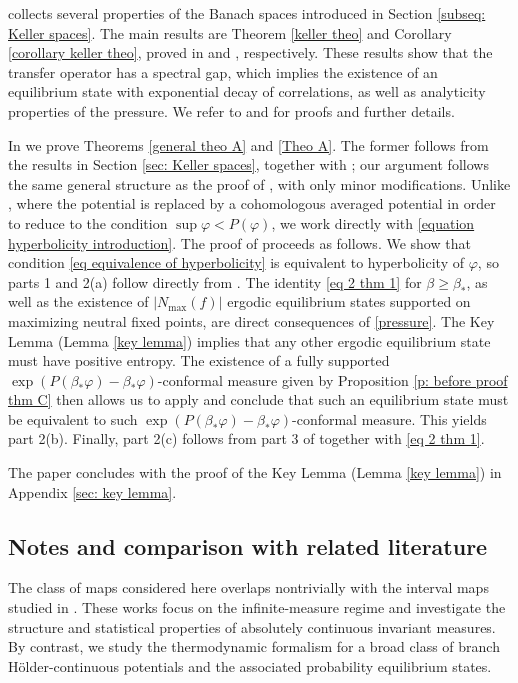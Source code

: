 \documentclass[12pt]{amsart}
\numberwithin{equation}{section} %
\numberwithin{figure}{section} %
\theoremstyle{plain}
\theoremstyle{definition}
\theoremstyle{remark}
\theoremstyle{citing}
\renewcommand{\=}{\coloneqq}
\newcommand{\Nmax}{N_\text{max}(f)}
\begin{document}
 collects several properties of the Banach spaces introduced in Section \ref{subseq: Keller spaces}. The main results are Theorem \ref{keller theo} and Corollary \ref{corollary keller theo}, proved in \cite{Keller1} and \cite{Juan1}, respectively. These results show that the transfer operator has a spectral gap, which implies the existence of an equilibrium state with exponential decay of correlations, as well as analyticity properties of the pressure. We refer to \cite{Keller1} and \cite{Juan1} for proofs and further details.

In  we prove Theorems \ref{general theo A} and \ref{Theo A}. The former follows from the results in Section \ref{sec: Keller spaces}, together with \cite[Theorem 6]{Dobbs}; our argument follows the same general structure as the proof of \cite[Theorem B]{Juan1}, with only minor modifications. Unlike \cite{Juan1}, where the potential is replaced by a cohomologous averaged potential in order to reduce to the condition $\sup\varphi<P(\varphi)$, we work directly with \eqref{equation hyperbolicity introduction}. The proof of  proceeds as follows. We show that condition \eqref{eq equivalence of hyperbolicity} is equivalent to hyperbolicity of $\varphi$, so parts 1 and 2(a) follow directly from . The identity \eqref{eq 2 thm 1} for $\beta\geq \beta_*$, as well as the existence of $|\Nmax|$ ergodic equilibrium states supported on maximizing neutral fixed points, are direct consequences of \eqref{pressure}. The Key Lemma (Lemma \ref{key lemma}) implies that any other ergodic equilibrium state must have positive entropy. The existence of a fully supported $\exp(P(\beta_*\varphi)-\beta_*\varphi)$-conformal measure given by Proposition \ref{p: before proof thm C} then allows us to apply \cite[Theorem 6]{Dobbs} and conclude that such an equilibrium state must be equivalent to such $\exp(P(\beta_*\varphi)-\beta_*\varphi)$-conformal measure. This yields part 2(b). Finally, part 2(c) follows from part 3 of  together with \eqref{eq 2 thm 1}.

The paper concludes with the proof of the Key Lemma (Lemma \ref{key lemma}) in Appendix \ref{sec: key lemma}.

\subsection{Notes and comparison with related literature}
The class of maps considered here overlaps nontrivially with the interval maps studied in \cite{zweimuller1,zweimuller2,MelbourneTerhesiu}. These works focus on the infinite-measure regime and investigate the structure and statistical properties of absolutely continuous invariant measures. By contrast, we study the thermodynamic formalism for a broad class of branch Hölder-continuous potentials and the associated probability equilibrium states.
\end{document}
